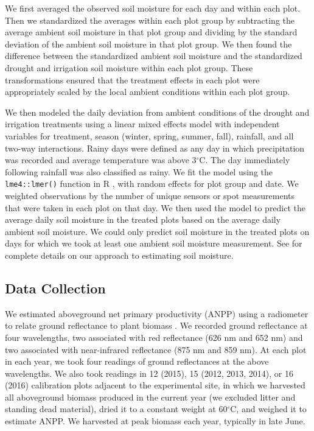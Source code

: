 \documentclass[fleqn,10pt,lineno]{wlpeerj} %
\begin{document}
We first averaged the observed soil moisture for each day and within
each plot. Then we standardized the averages within each plot group by
subtracting the average ambient soil moisture in that plot group and
dividing by the standard deviation of the ambient soil moisture in that
plot group. We then found the difference between the standardized
ambient soil moisture and the standardized drought and irrigation soil
moisture within each plot group. These transformations ensured that the
treatment effects in each plot were appropriately scaled by the local
ambient conditions within each plot group.

We then modeled the daily deviation from ambient conditions of the
drought and irrigation treatments using a linear mixed effects model
with independent variables for treatment, season (winter, spring,
summer, fall), rainfall, and all two-way interactions. Rainy days were
defined as any day in which precipitation was recorded and average
temperature was above 3\(^{\circ}\)C. The day immediately following
rainfall was also classified as rainy. We fit the model using the
\texttt{lme4::lmer()} function \citep{Bates2015} in R \citep{R2016},
with random effects for plot group and date. We weighted observations by
the number of unique sensors or spot measurements that were taken in
each plot on that day. We then used the model to predict the average
daily soil moisture in the treated plots based on the average daily
ambient soil moisture. We could only predict soil moisture in the
treated plots on days for which we took at least one ambient soil
moisture measurement. See \citet{Kleinhesselink2017b} for complete
details on our approach to estimating soil moisture.

\subsection{Data Collection}\label{data-collection}

We estimated aboveground net primary productivity (ANPP) using a
radiometer to relate ground reflectance to plant biomass \citep[see][
for a review]{Byrne2011}. We recorded ground reflectance at four
wavelengths, two associated with red reflectance (626 nm and 652 nm) and
two associated with near-infrared reflectance (875 nm and 859 nm). At
each plot in each year, we took four readings of ground reflectances at
the above wavelengths. We also took readings in 12 (2015), 15 (2012,
2013, 2014), or 16 (2016) calibration plots adjacent to the experimental
site, in which we harvested all aboveground biomass produced in the
current year (we excluded litter and standing dead material), dried it
to a constant weight at 60\(^{\circ}\)C, and weighed it to estimate
ANPP. We harvested at peak biomass each year, typically in late June.
\end{document}
